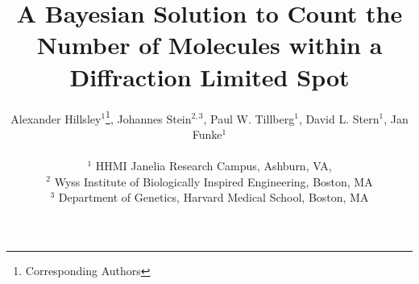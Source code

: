 \documentclass[twocolumn]{article}
\begin{document}
\title{A Bayesian Solution to Count the Number of Molecules within a Diffraction Limited Spot}

\author{
  Alexander Hillsley$^{1}$\thanks{Corresponding Authors},
  Johannes Stein$^{2,3}$,
  Paul W. Tillberg$^{1}$,
  David L. Stern$^{1}$,
  Jan Funke$^{1}$\footnotemark[1]
  \\\\
  \normalsize{$^1$ HHMI Janelia Research Campus, Ashburn, VA}, \\
  \normalsize{$^2$ Wyss Institute of Biologically Inspired Engineering, Boston, MA} \\
  \normalsize{$^3$ Department of Genetics, Harvard Medical School, Boston, MA}
  }

\maketitle











{
  \small
  
  
}

\clearpage
% 
\end{document}

